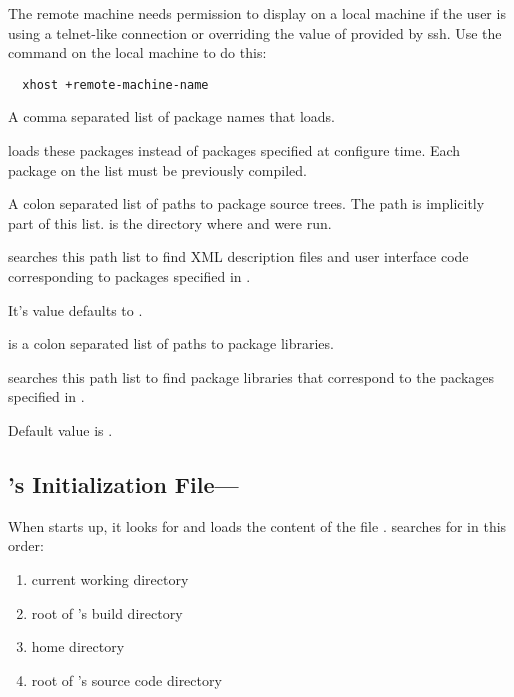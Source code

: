 \begin{description}
  The remote machine needs permission to display on
  a local machine if the user is using a telnet-like connection or overriding the value of    provided by ssh.
  Use the  command on the local machine to do
  this:

\begin{verbatim}
  xhost +remote-machine-name
\end{verbatim}
  
   A comma separated list of package names that
  \sr{} loads.
  
  \sr{} loads these packages instead of packages specified at
  configure time. Each package on the list must be previously
  compiled.
  
   A colon separated list of paths to
  package source trees.  The path
   is implicitly part of this
  list.   is the directory where
   and  were run.
  
  \sr{} searches this path list to find XML description files and
  user interface code corresponding to packages
  specified in .
  
  It's value defaults to .
  
    is a colon
  separated list of paths to package libraries.
  
  \sr{} searches this path list to find package libraries
  that correspond to the packages specified in
  .
  
  Default value is .

  
\end{description}

\subsection{\sr{}'s Initialization File---}
\label{sec:scirunrc}

When \sr{} starts up, it looks for and
loads the content of the file .  \sr{} searches for
 in this order:

\begin{enumerate}
\item current working directory
\item root of \sr's build directory
\item home directory
\item root of \sr's source code directory
\end{enumerate}

